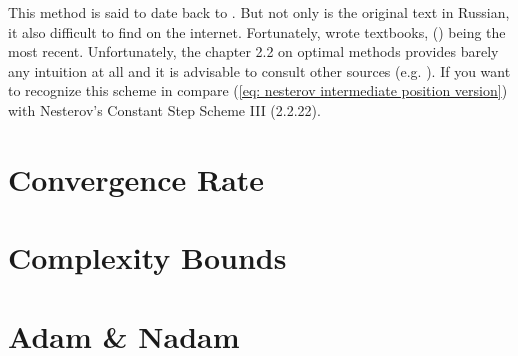 %
\begin{remark}
	This method is said to date back to \textcite{nesterovMethodSolvingConvex1983}.
	But not only is the original text in Russian, it also difficult 
	to find on the internet. Fortunately, \citeauthor{nesterovMethodSolvingConvex1983}
	wrote textbooks, 
	(\citeyear{nesterovLecturesConvexOptimization2018}) being the most recent.
	Unfortunately, the chapter 2.2 on optimal methods provides barely any
	intuition at all and it is advisable to consult other sources (e.g.
	\textcite{dontlooWhatDifferenceMomentum2016}). If you
	want to recognize this scheme in \textcite{nesterovLecturesConvexOptimization2018}
	compare (\ref{eq: nesterov intermediate position version}) with Nesterov's
	Constant Step Scheme III (2.2.22).
 \end{remark}



\section{Convergence Rate}

\section{Complexity Bounds}

\section{Adam \& Nadam}


\endinput
